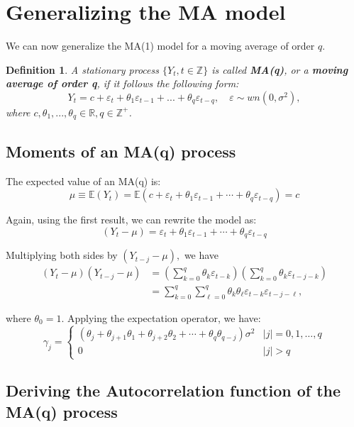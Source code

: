 \documentclass[11pt, a4paper]{report}
\theoremstyle{plain}
\theoremstyle{plain}
\newtheorem{defn}{Definition}[section]
\theoremstyle{remark}
\begin{document}
\section{Generalizing the MA model}

We can now generalize the MA(1) model for a moving average of order $q$.

\begin{defn}
	A stationary process $\{Y_t, t \in \mathbb{Z} \}$ is called \textbf{MA(q)}, or a \textbf{moving average of order q}, if it follows the following form:
	$$ Y_t = c + \varepsilon_t + \theta_1 \varepsilon_{t-1} + ... + \theta_q \varepsilon_{t-q}, \hspace{1em} \varepsilon \sim wn(0, \sigma^2), $$
	where $c, \theta_1, ..., \theta_q \in \mathbb{R}, q \in \mathbb{Z}^+$.
\end{defn}

\subsection{Moments of an MA(q) process}

The expected value of an MA(q) is:
$$
\mu \equiv \mathbb{E}\left(Y_{t}\right)=\mathbb{E}\left(c+\varepsilon_{t}+\theta_{1} \varepsilon_{t-1}+\cdots+\theta_{q} \varepsilon_{t-q}\right)=c
$$

Again, using the first result, we can rewrite the model as:
$$
\left(Y_{t}-\mu\right)=\varepsilon_{t}+\theta_{1} \varepsilon_{t-1}+\cdots+\theta_{q} \varepsilon_{t-q}
$$

Multiplying both sides by $\left(Y_{t-j}-\mu\right),$ we have
$$
\begin{aligned}
	\left(Y_{t}-\mu\right)\left(Y_{t-j}-\mu\right) &=\left(\sum_{k=0}^{q} \theta_{k} \varepsilon_{t-k}\right)\left(\sum_{k=0}^{q} \theta_{k} \varepsilon_{t-j-k}\right) \\
	&=\sum_{k=0}^{q} \sum_{\ell=0}^{q} \theta_{k} \theta_{\ell} \varepsilon_{t-k} \varepsilon_{t-j-\ell},
\end{aligned}
$$

where $\theta_{0}=1 .$ Applying the expectation operator, we have:
$$
\gamma_{j}=\left\{\begin{array}{ll}
	\left(\theta_{j}+\theta_{j+1} \theta_{1}+\theta_{j+2} \theta_{2}+\cdots+\theta_{q} \theta_{q-j}\right) \sigma^{2} & |j|=0,1, \ldots, q \\
	0 & |j|>q
\end{array}\right.
$$

\subsection{Deriving the Autocorrelation function of the MA(q) process}
\end{document}
